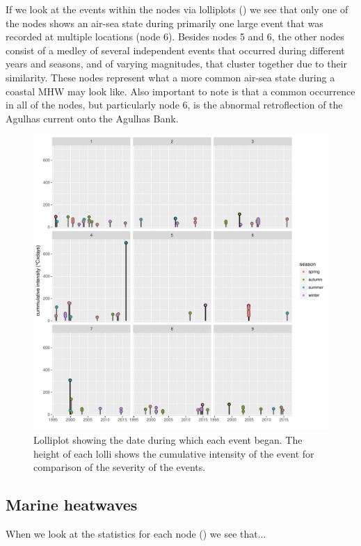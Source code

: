 \documentclass[a4paper,10pt,review]{elsarticle}
\begin{document}
If we look at the events within the nodes via lolliplots () we see that only one of the nodes shows an air-sea state during primarily one large event that was recorded at multiple locations (node 6). Besides nodes 5 and 6, the other nodes consist of a medley of several independent events that occurred during different years and seasons, and of varying magnitudes, that cluster together due to their similarity. These nodes represent what a more common air-sea state during a coastal MHW may look like. Also important to note is that a common occurrence in all of the nodes, but particularly node 6, is the abnormal retroflection of the Agulhas current onto the Agulhas Bank.

\begin{figure}
\includegraphics[width=1.0\textwidth]{figure_4.pdf}
\caption{Lolliplot showing the date during which each event began. The height of each lolli shows the cumulative intensity of the event for comparison of the severity of the events.}
\label{figure4}
\end{figure}

\subsection{Marine heatwaves}
When we look at the statistics for each node () we see that...
\end{document}
